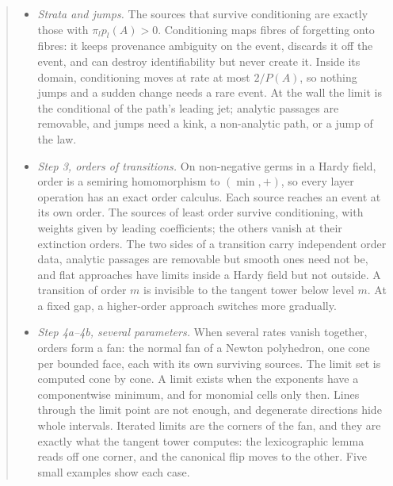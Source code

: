 \documentclass[11pt]{article}
\theoremstyle{definition}\newtheorem{definition}[theorem]{Definition}\newtheorem{remark}[theorem]{Remark}\newtheorem{example}[theorem]{Example}
\begin{document}
\begin{abstract}
\begin{itemize}
  conditioning map feasible cones \emph{onto} feasible cones, with explicit lifts; conditioning's lift shrinks like $p(A)$ near its wall.
  The cone $T^kH$ of the half-line is generated by elementary tensors, so it is closed under products, and pooling is a morphism at
  every order: the pooling paradox lives in the decision functional, not in pooling. Differentiating the contextual Bayes decomposition
  splits every sensitivity into a reweighting term and a within-source term; in the worked example the answer $\tfrac9{23}$ moves at rate
  $-\tfrac{16}{529}$ per unit of small-trial share.
\item \emph{Strata and jumps.} The sources that survive conditioning are exactly those with $\pi_lp_l(A)>0$. Conditioning maps fibres of
  forgetting onto fibres: it keeps provenance ambiguity on the event, discards it off the event, and can destroy identifiability but
  never create it. Inside its domain, conditioning moves at rate at most $2/P(A)$, so nothing jumps and a sudden change needs a rare event.
  At the wall the limit is the conditional of the path's leading jet; analytic passages are removable, and jumps need a kink, a
  non-analytic path, or a jump of the law.
\item \emph{Step 3, orders of transitions.} On non-negative germs in a Hardy field, order is a semiring homomorphism to $(\min,+)$, so every
  layer operation has an exact order calculus. Each source reaches an event at its own order. The sources of least order survive
  conditioning, with weights given by leading coefficients; the others vanish at their extinction orders. The two sides of a transition
  carry independent order data, analytic passages are removable but smooth ones need not be, and flat approaches have limits inside a
  Hardy field but not outside. A transition of order $m$ is invisible to the tangent tower below level $m$. At a fixed gap, a
  higher-order approach switches more gradually.
\item \emph{Step 4a--4b, several parameters.} When several rates vanish together, orders form a fan: the normal fan of a Newton
  polyhedron, one cone per bounded face, each with its own surviving sources. The limit set is computed cone by cone. A limit exists when
  the exponents have a componentwise minimum, and for monomial cells only then. Lines through the limit point are not enough, and
  degenerate directions hide whole intervals. Iterated limits are the corners of the fan, and they are exactly what the tangent tower
  computes: the lexicographic lemma reads off one corner, and the canonical flip moves to the other. Five small examples show each case.

\end{itemize}
\end{abstract}
\end{document}
